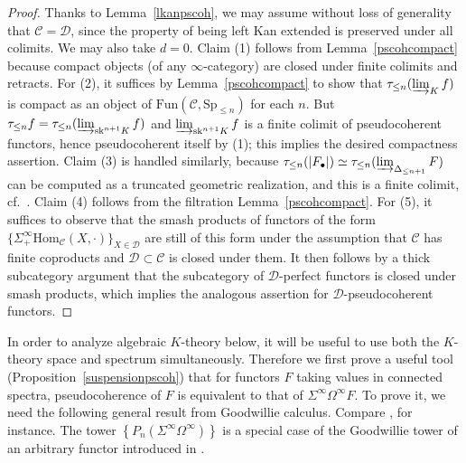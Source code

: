 \documentclass{amsart}
\renewcommand{\hom}{\mathrm{Hom}}
\newcommand{\fun}{\mathrm{Fun}}
\renewcommand{\sp}{\mathrm{Sp}}
\theoremstyle{definition}
\begin{document}
\begin{proof} 
Thanks to Lemma~\ref{lkanpscoh}, 
 we may assume without loss of generality that $\mathcal{C} =
\mathcal{D}$, since the property of being left Kan extended is preserved under
all colimits. We may also take $d = 0$. 
 Claim (1) follows from 
Lemma~\ref{pscohcompact} because
compact objects (of any $\infty$-category) are closed under finite colimits and
retracts. 
For (2), 
it suffices by Lemma~\ref{pscohcompact} to show that
$\tau_{\leq n} ( \varinjlim_K f )$ is compact as an object of $\fun(\mathcal{C},
\sp_{\leq n})$ for each $n$. 
But $\tau_{\leq n} f = \tau_{\leq n}  ( \varinjlim_{\mathrm{sk}^{n+1} K } f)$
and
$\varinjlim_{\mathrm{sk}^{n+1} K } f$ is a finite colimit of pseudocoherent
functors, hence pseudocoherent itself by (1); this implies the desired compactness
assertion. 
Claim (3) is handled similarly, because
$\tau_{\leq n} ( |F_\bullet|) \simeq \tau_{\leq n} ( \varinjlim_{\Delta_{\leq
n+1} }F)$ can be computed as a truncated geometric realization, and this is a
finite colimit, cf.~\cite[Lemma~1.2.4.17]{HA}. 
Claim (4) follows from the filtration Lemma~\ref{pscohcompact}. 
For (5), it suffices to observe that the smash products of functors of the form
$\{\Sigma^\infty_+ \hom_{\mathcal{C}}(X, \cdot)\}_{X \in \mathcal{D}}$ are still of this form under the
assumption that $\mathcal{C}$ has finite coproducts and $\mathcal{D} \subset
\mathcal{C}$ is closed under them. It then follows
by a thick subcategory argument that the subcategory of $\mathcal{D}$-perfect functors is
closed under smash products, which implies the analogous assertion for
$\mathcal{D}$-pseudocoherent functors. 
\end{proof} 

In order to analyze algebraic $K$-theory below, it will be useful to use 
both the $K$-theory space and spectrum simultaneously. Therefore we first prove
a useful tool
(Proposition~\ref{suspensionpscoh}) that for functors $F$
taking values in connected spectra, pseudocoherence of $F$ is equivalent to
that of $\Sigma^\infty \Omega^\infty F$. 
To prove it, we need the
following general result from Goodwillie calculus. Compare \cite[Cor.
1.3]{AhKu}, for instance. 
The tower $\left\{P_n(\Sigma^\infty \Omega^\infty)\right\}$ is a special case
of the Goodwillie tower of an arbitrary functor introduced in \cite{GooIII}. 
\end{document}
